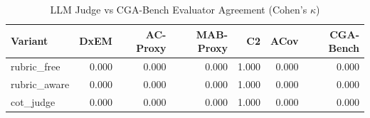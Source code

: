 \begin{table}[htbp]
\centering
\caption{LLM Judge vs CGA-Bench Evaluator Agreement (Cohen's $\kappa$)}
\label{tab:llm_judge_agreement}
\begin{tabular}{lrrrrrr}
\toprule
Variant & DxEM & AC-Proxy & MAB-Proxy & C2 & ACov & CGA-Bench \\
\midrule
rubric\_free & 0.000 & 0.000 & 0.000 & 1.000 & 0.000 & 0.000 \\
rubric\_aware & 0.000 & 0.000 & 0.000 & 1.000 & 0.000 & 0.000 \\
cot\_judge & 0.000 & 0.000 & 0.000 & 1.000 & 0.000 & 0.000 \\
\bottomrule
\end{tabular}
\end{table}
